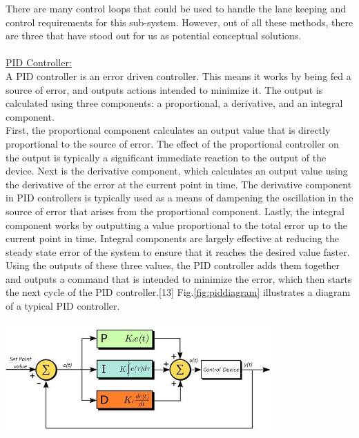 \documentclass[titlepage]{article}
\begin{document}
There are many control loops that could be used to handle the lane keeping and control requirements for this sub-system. However, out of all these methods, there are three that have stood out for us as potential conceptual solutions.\\~\\
\underline{PID Controller:}\\
\indent A PID controller is an error driven controller. This means it works by being fed a source of error, and outputs actions intended to minimize it. The output is calculated using three components: a proportional, a derivative, and an integral component. \\
\indent First, the proportional component calculates an output value that is directly proportional to the source of error. The effect of the proportional controller on the output is typically a significant immediate reaction to the output of the device. Next is the derivative component, which calculates an output value using the derivative of the error at the current point in time. The derivative component in PID controllers is typically used as a means of dampening the oscillation in the source of error that arises from the proportional component. Lastly, the integral component works by outputting a value proportional to the total error up to the current point in time. Integral components are largely effective at reducing the steady state error of the system to ensure that it reaches the desired value faster.  Using the outputs of these three values, the PID controller adds them together and outputs a command that is intended to minimize the error, which then starts the next cycle of the PID controller.[13] Fig.\ref{fig:piddiagram} illustrates a diagram of a typical PID controller.\\

\begin{center}
	\includegraphics[width=4in]{PID2.jpg}\\
	 \label{fig:piddiagram}
\end{center}
\end{document}
